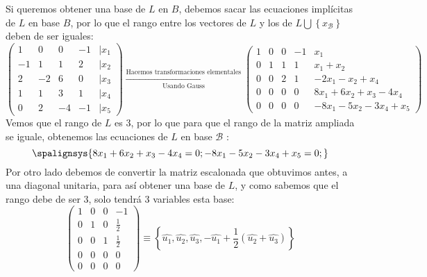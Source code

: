 Si queremos obtener una base de \(L\) en \(B\), debemos sacar las ecuaciones implícitas de \(L\) en base \(B\), por lo que el rango entre los vectores de \(L\) y los de \(L \bigcup \left\{x_\mathcal{B}\right\} \) deben de ser iguales:
\[
        \begin{pmatrix}
                1  & 0  & 0  & -1 & | x_1 \\
                -1 & 1  & 1  & 2  & |x_2  \\
                2  & -2 & 6  & 0  & |x_3  \\
                1  & 1  & 3  & 1  & |x_4  \\
                0  & 2  & -4 & -1 & |x_5
        \end{pmatrix}
        \xrightarrow[\text{Usando Gauss}]{\text{Hacemos transformaciones elementales}}
        \begin{pmatrix}
                1 & 0 & 0 & -1 & x_1                      \\
                0 & 1 & 1 & 1  & x_1 + x_2                \\
                0 & 0 & 2 & 1  & -2x_1 - x_2 +x_4         \\
                0 & 0 & 0 & 0  & 8x_1 + 6x_2 + x_3 - 4x_4 \\
                0 & 0 & 0 & 0  & -8x_1 -5x_2 - 3x_4 + x_5
        \end{pmatrix}
\]
Vemos que el rango de \(L\) es 3, por lo que para que el rango de la matriz ampliada se iguale, obtenemos las ecuaciones de \(L\) en base \(\mathcal{B}\) :
\[
        \spalignsys{
                8x_1 + 6x_2 + x_3 - 4x_4 = 0;
                -8x_1 -5x_2 - 3x_4 + x_5 = 0;
        }
\]
Por otro lado debemos de convertir la matriz escalonada que obtuvimos antes, a una diagonal unitaria, para así obtener una base de \(L\), y como sabemos que el rango debe de ser 3, solo tendrá 3 variables esta base:
\[
        \begin{pmatrix}
                1 & 0 & 0 & -1          \\
                0 & 1 & 0 & \frac{1}{2} \\
                0 & 0 & 1 & \frac{1}{2} \\
                0 & 0 & 0 & 0           \\
                0 & 0 & 0 & 0
        \end{pmatrix} \equiv \left \{ \hat{u_1}, \hat{u_2}, \hat{u_3}, -\hat{u_1} + \frac{1}{2}(\hat{u_2} + \hat{u_3}) \right \}
\]